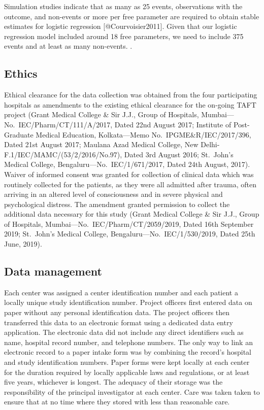 \documentclass[
]{article}
\begin{document}
Simulation studies indicate that as many as 25 events, observations with
the outcome, and non-events or more per free parameter are required to
obtain stable estimates for logistic regression {[}@Courvoisier2011{]}.
Given that our logistic regression model included around 18 free
parameters, we need to include 375 events and at least as many
non-events. .

\hypertarget{ethics}{%
\subsection{Ethics}\label{ethics}}

Ethical clearance for the data collection was obtained from the four
participating hospitals as amendments to the existing ethical clearance
for the on-going TAFT project (Grant Medical College \& Sir J.J., Group
of Hospitals, Mumbai---No.~IEC/Pharm/CT/111/A/2017, Dated 22nd August
2017; Institute of Post-Graduate Medical Education, Kolkata---Memo
No.~IPGME\&R/IEC/2017/396, Dated 21st August 2017; Maulana Azad Medical
College, New Delhi-F.1/IEC/MAMC/(53/2/2016/No.97), Dated 3rd August
2016; St.~John's Medical College, Bengaluru---No.~IEC/1/671/2017, Dated
24th August, 2017). Waiver of informed consent was granted for
collection of clinical data which was routinely collected for the
patients, as they were all admitted after trauma, often arriving in an
altered level of consciousness and in severe physical and psychological
distress. The amendment granted permission to collect the additional
data necessary for this study (Grant Medical College \& Sir J.J., Group
of Hospitals, Mumbai---No.~IEC/Pharm/CT/2059/2019, Dated 16th September
2019; St.~John's Medical College, Bengaluru---No.~IEC/1/530/2019, Dated
25th June, 2019).

\hypertarget{data-management}{%
\subsection{Data management}\label{data-management}}

Each center was assigned a center identification number and each patient
a locally unique study identification number. Project officers first
entered data on paper without any personal identification data. The
project officers then transferred this data to an electronic format
using a dedicated data entry application. The electronic data did not
include any direct identifiers such as name, hospital record number, and
telephone numbers. The only way to link an electronic record to a paper
intake form was by combining the record's hospital and study
identification numbers. Paper forms were kept locally at each center for
the duration required by locally applicable laws and regulations, or at
least five years, whichever is longest. The adequacy of their storage
was the responsibility of the principal investigator at each center.
Care was taken taken to ensure that at no time where they stored with
less than reasonable care.
\end{document}
